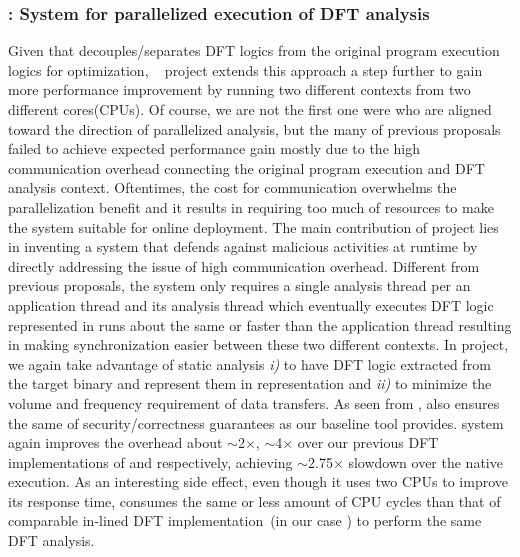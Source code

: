 \documentclass[letterpaper, 10pt]{article}
\begin{document}
\begin{small}
\subsubsection*{\SR: System for parallelized execution of DFT analysis} 
%
Given that \TFA decouples/separates DFT logics from the original program
execution logics for optimization, \SR~\cite{sreplica:2013ccs} project extends
this approach a step further to gain more performance improvement by running
two different contexts from two different cores(CPUs). 
%
Of course, we are not the first one were who are aligned toward the direction
of parallelized analysis, but the many of previous proposals failed to achieve
expected performance gain mostly due to the high communication overhead
connecting the original program execution and DFT analysis context.
Oftentimes, the cost for communication overwhelms the parallelization benefit
and it results in requiring too much of resources to make the system suitable
for online deployment. 
%
The main contribution of \SR project lies in inventing a system that defends
against malicious activities at runtime by directly addressing the issue of
high communication overhead. Different from previous proposals, the system only
requires a single analysis thread per an application thread and its analysis
thread which eventually executes DFT logic represented in \TFA runs about the
same or faster than the application thread resulting in making synchronization
easier between these two different contexts.
%
In \SR project, we again take advantage of static analysis  {\it i)} to have
DFT logic extracted from the target binary and represent them in \TFA
representation and {\it ii)} to minimize the volume and frequency requirement
of data transfers. As seen from \TFA, \SR also ensures the same of
security/correctness guarantees as our baseline tool provides.
%
\SR system again improves the overhead about $\sim$2$\times$, $\sim$4$\times$
over our previous DFT implementations of \TFA and \libdft respectively,
achieving $\sim$2.75$\times$ slowdown over the native execution.
%
As an interesting side effect, even though it uses two CPUs to improve its
response time, \SR consumes the same or less amount of CPU cycles than that of
comparable in-lined DFT implementation~(in our case \TFA) to perform the same
DFT analysis. 



\end{small}
\end{document}
